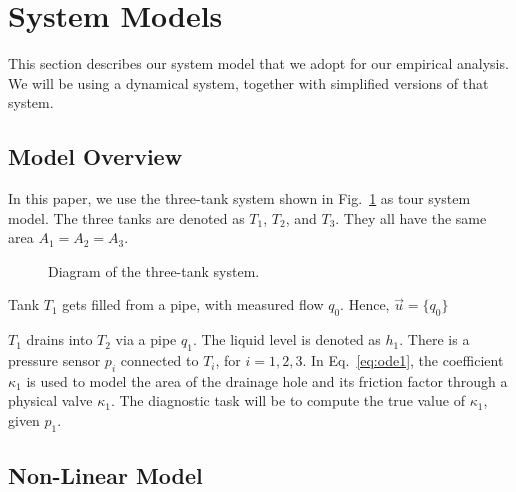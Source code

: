 \section{System Models}

This section describes our system model that we adopt for our empirical analysis. We will be using a dynamical system, together with simplified versions of that system.

\subsection{Model Overview}

In this paper, we use the three-tank system shown in Fig.~\ref{fig:three_tanks} as tour system model. The three tanks are denoted as $T_1$, $T_2$, and $T_3$. They all have the same area $A_1 = A_2 = A_3.$

\begin{figure}[htb]
  \centering
  \caption{Diagram of the three-tank system.}
  \label{fig:three_tanks}
\end{figure}
\par\noindent

Tank $T_1$ gets filled from a pipe, with measured flow $q_0$. Hence, $\vec{u}=\{q_0\}$%

$T_1$ drains into $T_2$ via a pipe $q_1$. The liquid level is denoted as $h_1$. There is a pressure sensor $p_i$ connected to $T_i$, for $i=1,2,3$.
In Eq.~\ref{eq:ode1}, the coefficient $\kappa_1$ is used to model the area of the drainage hole and its friction factor through a physical valve $\kappa_1$.%
The diagnostic task will be to compute the true value of $\kappa_1$, given $p_1$.

\subsection{Non-Linear Model}

